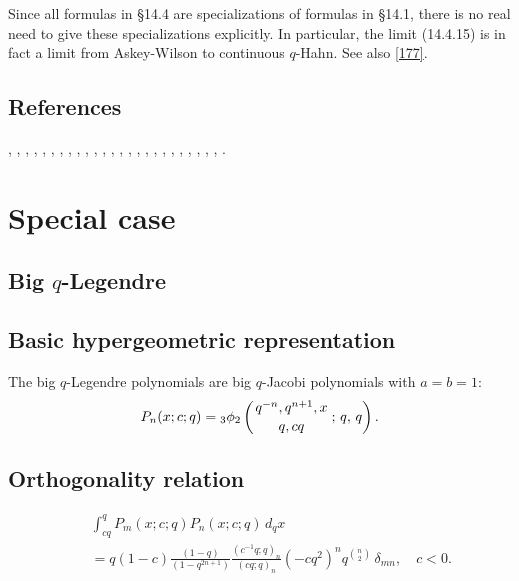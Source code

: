 \documentclass[envcountchap,graybox]{svmono}
\newcounter{rom}
\newcommand{\qhyp}[5]{\mbox{}_{#1}{\phi}_{#2}
\left(\genfrac{}{}{0pt}{}{#3}{#4}\,;\,q,\,#5\right)}
\newcommand{\qhyp}[5]{\,\mbox{}_{#1}\phi_{#2}\!\left(
  \genfrac{}{}{0pt}{}{#3}{#4};#5\right)}
\begin{document}
Since all formulas in \S14.4 are specializations of formulas in \S14.1,
there is no real need to give these specializations explicitly.
In particular, the limit (14.4.15) is in fact a limit from Askey-Wilson to
continuous $q$-Hahn. See also \eqref{177}.
%

\subsection*{References}
\cite{NAlSalam89}, \cite{AlSalam90}, \cite{AndrewsAskey85}, \cite{AtakKlimyk2004},
\cite{AtakRahmanSuslov}, \cite{DattaGriffin}, \cite{FloreaniniVinetII},
\cite{GasperRahman90}, \cite{GrunbaumHaine96}, \cite{Gupta92}, \cite{Hahn},
\cite{Ismail86I}, \cite{IsmailStanton97}, \cite{IsmailWilson}, \cite{KalninsMiller88},
\cite{KoelinkE}, \cite{Koorn90II}, \cite{Koorn93}, \cite{Koorn2007}, \cite{Miller89},
\cite{Nikiforov+}, \cite{NoumiMimachi90II}, \cite{NoumiMimachi90III},
\cite{NoumiMimachi91}, \cite{Spiridonov97}, \cite{SrivastavaJain90}.


\section*{Special case}

\subsection{Big $q$-Legendre}
\par

\subsection*{Basic hypergeometric representation} The big $q$-Legendre polynomials are big $q$-Jacobi polynomials
with $a=b=1$:
\begin{equation}
\label{DefBigqLegendre}
P_n(x;c;q)=\qhyp{3}{2}{q^{-n},q^{n+1},x}{q,cq}{q}.
\end{equation}

\subsection*{Orthogonality relation}
\begin{eqnarray}
\label{OrtBigqLegendre}
& &\int_{cq}^{q}P_m(x;c;q)P_n(x;c;q)\,d_qx\nonumber\\
& &{}=q(1-c)\frac{(1-q)}{(1-q^{2n+1})}
\frac{(c^{-1}q;q)_n}{(cq;q)_n}(-cq^2)^nq^{\binom{n}{2}}\,\delta_{mn},\quad c<0.
\end{eqnarray}
\end{document}
